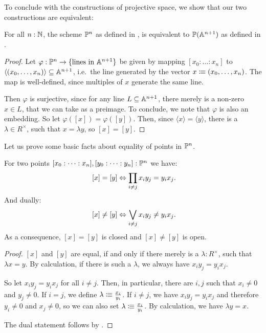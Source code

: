 To conclude with the constructions of projective space,
we show that our two constructions are equivalent:

\begin{proposition}
  \label{space-of-lines-is-projective-space}
  For all $n:\mathbb{N}$, the scheme $\mathbb{P}^n$ as defined in ,
  is equivalent to $\mathbb{P}(\mathbb{A}^{n+1})$ as defined in .
\end{proposition}

\begin{proof}
  Let $\varphi:\mathbb{P}^n\to \{\text{lines in $\mathbb{A}^{n+1}$}\}$
  be given by mapping $[x_0:\dots:x_n]$ to $\langle (x_0,\dots,x_n)\rangle\subseteq \mathbb{A}^{n+1}$,
  i.e.\ the line generated by the vector $x\vcentcolon\mspace{-1.2mu}\equiv (x_0,\dots,x_n)$.
  The map is well-defined, since multiples of $x$ generate the same line.

  Then $\varphi$ is surjective,
  since for any line $L\subseteq \mathbb{A}^{n+1}$,
  there merely is a non-zero $x\in L$,
  that we can take as a preimage.
  To conclude, we note that $\varphi$ is also an embedding.
  So let $\varphi([x])=\varphi([y])$.
  Then, since $\langle x\rangle=\langle y\rangle$, there is a $\lambda\in R^\times$,
  such that $x=\lambda y$, so $[x]=[y]$.
\end{proof}

Let us prove some basic facts about equality of points in $\mathbb{P}^n$.

\begin{lemma}
  \label{equality-2-by-2-minor}
  For two points $[x_0:\dots:x_n],[y_0:\dots:y_n]:\mathbb{P}^n$ we have:
  \[
    [x]=[y] \Leftrightarrow \prod_{i\neq j}x_iy_j=y_ix_j
    \rlap{.}
  \]
  And dually:
  \[
    [x]\neq [y] \Leftrightarrow \bigvee_{i\neq j}x_iy_j\neq y_ix_j
    \rlap{.}
  \]
  As a consequence, $[x]=[y]$ is closed and $[x]\neq [y]$ is open.
\end{lemma}

\begin{proof}
  $[x]$ and $[y]$ are equal,
  if and only if there merely is a $\lambda:R^\times$,
  such that $\lambda x = y$.
  By calculation, if there is such a $\lambda$,
  we always have $x_iy_j=y_ix_j$.

  So let $x_iy_j=y_ix_j$ for all $i\neq j$.
  Then, in particular, there are $i,j$ such that $x_i\neq 0$ and $y_j\neq 0$.
  If $i=j$, we define $\lambda \vcentcolon\mspace{-1.2mu}\equiv \frac{x_i}{y_i}$.
  If $i\neq j$, we have $x_iy_j=y_ix_j$ and therefore $y_i\neq 0$ and $x_j\neq 0$,
  so we can also set $\lambda \vcentcolon\mspace{-1.2mu}\equiv \frac{x_i}{y_i}$.
  By calculation, we have $\lambda y=x$.

  The dual statement follows by .
\end{proof}

